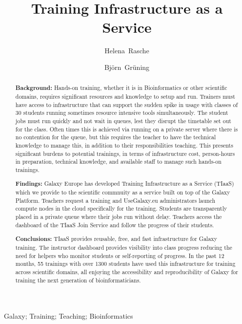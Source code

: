 \documentclass[a4paper,num-refs]{oup-contemporary}
\title{Training Infrastructure as a Service}
\author[1,\authfn{1},\authfn{2}]{Helena~Rasche}
\author[2,\authfn{2}]{Bj\"orn~Gr\"uning}
\affil[1]{Bioinformatics Group, Department of Computer Science, University of Freiburg, 79110 Freiburg im Breisgau, Germany}
\begin{document}
\begin{frontmatter}
\maketitle
\begin{abstract}
\textbf{Background:} Hands-on training, whether it is in Bioinformatics or other scientific domains, requires significant resources and knowledge to setup and run.
Trainers must have access to infrastructure that can support the sudden spike in usage with classes of 30 students running sometimes resource intensive tools simultaneously.
The student jobs must run quickly and not wait in queues, lest they disrupt the timetable set out for the class. Often times this is achieved via running on a private server where there is no contention for the queue, but this requires the teacher to have the technical knowledge to manage this, in addition to their responsibilities teaching. This presents significant burdens to potential trainings, in terms of infrastructure cost, person-hours in preparation, technical knowledge, and available staff to manage such hands-on trainings.

\textbf{Findings:} Galaxy Europe has developed Training Infrastructure as a Service (TIaaS) which we provide to the scientific commnuity as a service built on top of the Galaxy Platform. Teachers request a training and UseGalaxy.eu administrators launch compute nodes in the cloud specifically for the training. Students are transparently placed in a private queue where their jobs run without delay. Teachers access the dashboard of the TIaaS Join Service and follow the progress of their students.

\textbf{Conclusions:} TIaaS provides reusable, free, and fast infrastructure for Galaxy training. The instructor dashboard provides visibility into class progress reducing the need for helpers who monitor students or self-reporting of progress. In the past 12 months, 55 trainings with over 1300 students have used this infrastructure for training across scientific domains, all enjoying the accessibility and reproducibility of Galaxy for training the next generation of bioinformaticians.
\end{abstract}

\begin{keywords}
Galaxy; Training; Teaching; Bioinformatics
\end{keywords}
\end{frontmatter}
\end{document}
